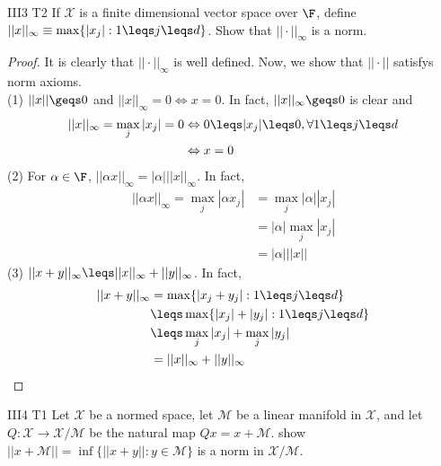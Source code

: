 \begin{exercise}{III3 T2}{}
    If $\mathscr{X}$ is a finite dimensional vector space over $\F$, define $||x||_{\infty}\equiv \max\{|x_j|:1\leqs j\leqs d\}$.
    Show that $||\cdot||_{\infty}$ is a norm.
\end{exercise}

\begin{proof}
    It is clearly that $||\cdot||_{\infty}$ is well defined.
    Now, we show that $||\cdot||$ satisfys norm axioms.\\
    (1) $||x||\geqs 0$ and $||x||_{\infty}=0\Leftrightarrow x=0$. In fact, $||x||_{\infty}\geqs 0$ is clear and 
    \begin{align*}
        ||x||_{\infty}=\max_{j}|x_j|=0&\Leftrightarrow 0\leqs |x_j|\leqs 0,\forall 1\leqs j\leqs d\\
                        &\Leftrightarrow x=0
    \end{align*}
    (2) For $\alpha\in\F$, $||\alpha x||_{\infty}=|\alpha|||x||_{\infty}$. In fact, 
    \begin{align*}
        ||\alpha x||_{\infty}= \max_{j}|\alpha x_j|&= \max_{j}|\alpha||x_j|\\
                            &= |\alpha|\max_{j}|x_j|\\
                            &= |\alpha|||x||
    \end{align*}
    (3) $||x+y||_{\infty}\leqs ||x||_{\infty}+||y||_{\infty}$. In fact, 
    \begin{align*}
        ||x+y||_{\infty}&=\max\{|x_j+y_j|:1\leqs j\leqs d\}\\
                        &\leqs \max \{|x_j|+|y_j|:1\leqs j\leqs d\}\\
                        &\leqs \max_{j}|x_j| +\max_{j}|y_j|\\
                        &=||x||_{\infty} + ||y||_{\infty}
    \end{align*}
\end{proof}

\begin{exercise}{III4 T1}{}
    Let $\mathscr{X}$ be a normed space, let $\mathscr{M}$ be a linear manifold in $\mathscr{X}$, 
    and let $Q:\mathscr{X}\rightarrow \mathscr{X}/\mathscr{M}$ be the natural map $Qx=x+\mathscr{M}$.
    show $||x+\mathscr{M}||=\inf\{||x+y||:y\in \mathscr{M}\}$ is a norm in $\mathscr{X}/\mathscr{M}$.
    
\end{exercise}


